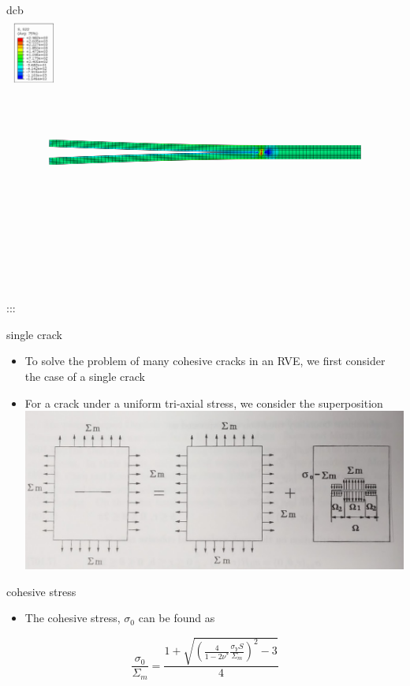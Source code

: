 \documentclass[
  letterpaper,
  ignorenonframetext,
  aspectratio=43,
  handout,
  12pt]{beamer}
\providecommand{\tightlist}{%
  \setlength{\itemsep}{0pt}\setlength{\parskip}{0pt}}
\providecommand{\tightlist}{%
\setlength{\itemsep}{0pt}\setlength{\parskip}{0pt}}
\let\Oldincludegraphics\includegraphics
\renewcommand{\includegraphics}[2][]{\Oldincludegraphics[width=\textwidth,height=0.7\textheight,keepaspectratio]{#2}}
\begin{document}
\begin{frame}{dcb}
\includegraphics{../images/dcb9.png}

:::
\end{frame}

\begin{frame}{single crack}
\protect\hypertarget{single-crack}{}
\begin{itemize}
\tightlist
\item
  To solve the problem of many cohesive cracks in an RVE, we first
  consider the case of a single crack
\item
  For a crack under a uniform tri-axial stress, we consider the
  superposition \includegraphics{../images/superposition.jpg}
\end{itemize}
\end{frame}

\begin{frame}{cohesive stress}
\protect\hypertarget{cohesive-stress}{}
\begin{itemize}
\tightlist
\item
  The cohesive stress, \(\sigma_0\) can be found as
\end{itemize}

\[\frac{\sigma_0}{\Sigma_m} = \frac{1+\sqrt{\left(\frac{4}{1-2\nu^*}\frac{\sigma_YS}{\Sigma_m}\right)^2-3}}{4}\]
\end{frame}
\end{document}
